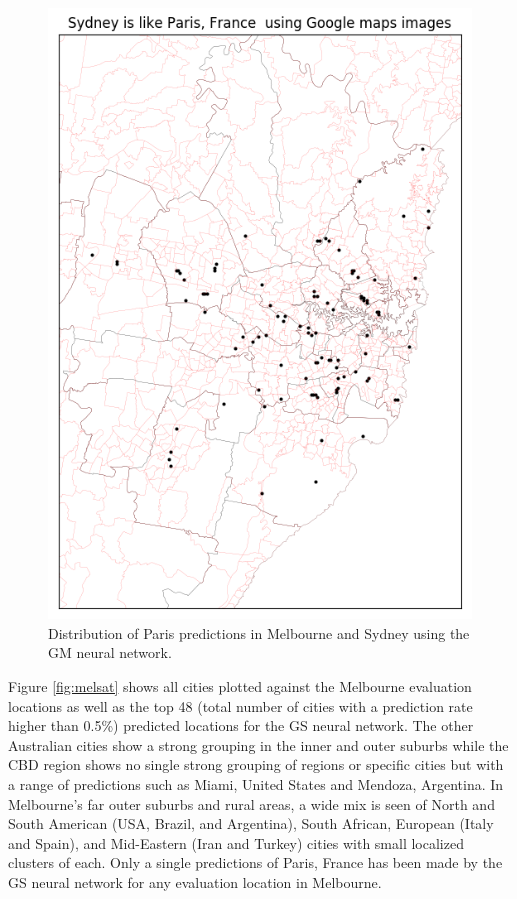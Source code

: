 \documentclass[sageh,times]{sagej}
\begin{document}
\begin{figure}[!htbp]
\includegraphics[scale=0.40]{Images/Sydney_Paris,France-GM.png} 
\caption{Distribution of Paris predictions in Melbourne and Sydney using the GM neural network.}    
 \label{fig:gm_melsyd_paris}  
\end{figure} 

Figure \ref{fig:melsat} shows all cities plotted against the Melbourne evaluation locations as well as the top 48 (total number of cities with a prediction rate higher than 0.5\%) predicted locations for the GS neural network. The other Australian cities show a strong grouping in the inner and outer suburbs while the CBD region shows no single strong grouping of regions or specific cities but with a range of predictions such as Miami, United States and Mendoza, Argentina. In Melbourne's far outer suburbs and rural areas, a wide mix is seen of North and South American (USA, Brazil, and Argentina), South African, European (Italy and Spain), and Mid-Eastern (Iran and Turkey) cities with small localized clusters of each. Only a single predictions of Paris, France has been made by the GS neural network for any evaluation location in Melbourne.
\end{document}
